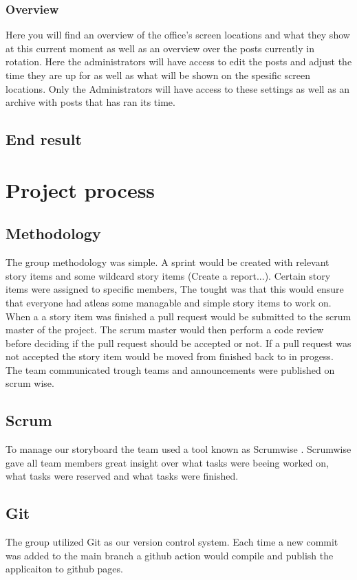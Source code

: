 \documentclass[12pt]{article}
\begin{document}
        \subsubsection{Overview}
Here you will find an overview of the office's screen locations and what they show at this current moment as well as an
overview over the posts currently in rotation.
Here the administrators will have access to edit the posts and adjust the time they are up for as well as what will
be shown on the spesific screen locations. Only the Administrators will have access to these settings as well as 
an archive with posts that has ran its time.

    \subsection{End result}

\section{Project process}
\subsection{Methodology}
The group methodology was simple. A sprint would be created with relevant story items and some wildcard story items (Create a report...).
Certain story items were assigned to specific members, The tought was that this would ensure that everyone had atleas some managable and simple story items
to work on. When a a story item was finished a pull request would be submitted to the scrum master of the project. The scrum master would then perform
a code review before deciding if the pull request should be accepted or not. If a pull request was not accepted the story item would be moved from finished back to
in progess. The team communicated trough teams and announcements were published on scrum wise. 

\subsection{Scrum}
To manage our storyboard the team used a tool known as Scrumwise \cite*{scrumwiseScrumToolsScrum}. Scrumwise gave all team members great insight over
what tasks were beeing worked on, what tasks were reserved and what tasks were finished.

\subsection{Git\cite*{Git}}
The group utilized Git as our version control system. Each time a new commit was added to the main branch a github action would compile and publish
the applicaiton to github pages.


\pagebreak
\printbibliography
\end{document}
